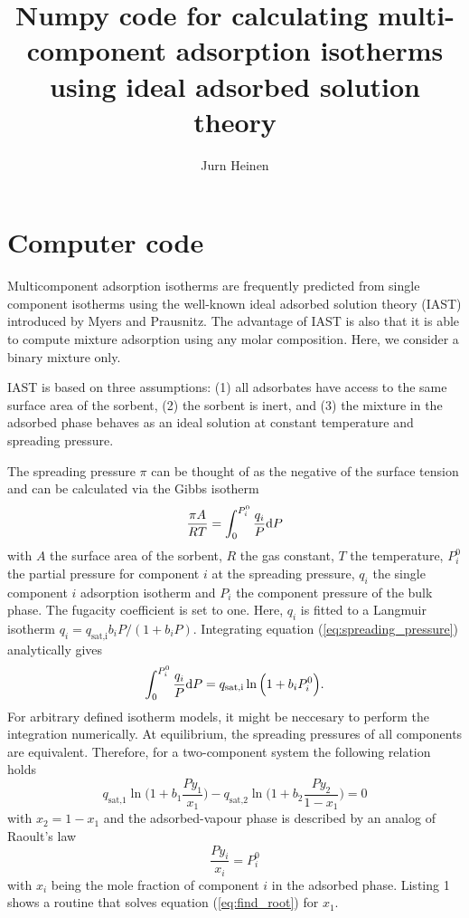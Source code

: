 \documentclass{article}
\begin{document}
\title{Numpy code for calculating multi-component adsorption isotherms using ideal adsorbed solution theory}
\author{Jurn Heinen}

\maketitle

\section{Computer code}

Multicomponent adsorption isotherms are frequently predicted from single component isotherms using the well-known ideal adsorbed solution theory (IAST) introduced by Myers and Prausnitz.\cite{Myers1965} The advantage of IAST is also that it is able to compute mixture adsorption using any molar composition. Here, we consider a binary mixture only.

IAST is based on three assumptions: (1) all adsorbates have access to the same surface area of the sorbent, (2) the sorbent is inert, and (3) the mixture in the adsorbed phase behaves as an ideal solution at constant temperature and spreading pressure.

The spreading pressure $\pi$ can be thought of as the negative of the surface tension and can be calculated via the Gibbs isotherm\cite{Myers1965}
%
\begin{equation}
        \frac{{\pi}A}{RT} = \int_0^{P_i^0}\frac{q_i}{P} {\dif P}
	\label{eq:spreading_pressure}
\end{equation}
%
with $A$ the surface area of the sorbent, $R$ the gas constant, $T$ the temperature, $P_i^0$ the partial pressure for component $i$ at the spreading pressure, $q_i$ the single component $i$ adsorption isotherm and $P_i$ the component pressure of the bulk phase. The fugacity coefficient is set to one. Here, $q_i$ is fitted to a Langmuir isotherm $q_i = q_\text{sat,i}b_iP/(1+b_iP)$. Integrating equation (\ref{eq:spreading_pressure}) analytically gives
%
\begin{equation}
	\int_0^{P_i^0}\frac{q_i}{P} {\dif P} =  q_\text{sat,i}\ln\Big({1+b_iP_i^0}\Big). 
\end{equation}
%
For arbitrary defined isotherm models, it might be neccesary to perform the integration numerically. At equilibrium, the spreading pressures of all components are equivalent. Therefore, for a two-component system the following relation holds 
%
\begin{equation} 
	q_\text{sat,1}\ln{\Big(1+b_1\frac{Py_1}{x_1}\Big)} - q_\text{sat,2}\ln{\Big(1+b_2\frac{Py_2}{1-x_1}\Big)} = 0
	\label{eq:find_root}
\end{equation} 
%
with $x_2 = 1 - x_1$ and the adsorbed-vapour phase is described by an analog of Raoult's law 
%
\begin{equation}
        \frac{Py_i}{x_i} = P_i^0
\end{equation}
%
with $x_i$ being the mole fraction of component $i$ in the adsorbed phase. Listing 1 shows a routine that solves  equation (\ref{eq:find_root}) for $x_1$.
\end{document}
